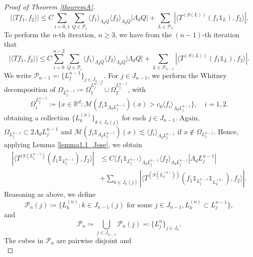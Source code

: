 \documentclass[12pt]{amsart}
\newcommand{\R}{\mathbb{R}}
\theoremstyle{plain}
\theoremstyle{definition} %
\numberwithin{equation}{section}
\begin{document}
\begin{proof}[Proof of Theorem \ref{theoremA}]
    \begin{equation}\label{eq:Level2Bound}
        |\langle Tf_1,f_2\rangle|
        \leq 
        C\sum_{i=0,1}\sum_{Q\in\mathcal{P}_i}
        \langle f_1\rangle_{\Lambda_d Q}\langle f_2\rangle_{\Lambda_d Q}|\Lambda_d Q|
        +
        \sum_{L\in \mathcal{P}_2}|\langle T^{(S(L))}(f_1\mathds{1}_{L}),f_2\rangle|.
    \end{equation}
To perform the $n$-th iteration, $n\geq 3$, we have from the $(n-1)$-th iteration that
    \begin{equation}\label{eq:LevelNMinus1Bound}
        |\langle Tf_1,f_2\rangle|
        \leq 
        C\sum_{i=0}^{n-2}\sum_{Q\in\mathcal{P}_i}
        \langle f_1\rangle_{\Lambda_d Q}\langle f_2\rangle_{\Lambda_d Q}|\Lambda_d Q|
        +
        \sum_{L\in \mathcal{P}_{n-1}}|\langle T^{(S(L))}(f_1\mathds{1}_{L}),f_2\rangle|.
    \end{equation}
    We write $\mathcal{P}_{n-1}\eqqcolon\{L_j^{n-1}\}_{j\in J_{n-1}}$. For $j\in J_{n-1}$, we perform the Whitney decomposition of $\Omega_{L_j^{n-1}}\coloneqq \Omega_1^{L_{j}^{n-1}}\cup \Omega_2^{L_j^{n-1}}$, with
    \[
    \Omega_{i}^{L_j^{n-1}}
    \coloneqq 
    \{x\in\R^d: \mathcal{M}(f_i\mathds{1}_{\Lambda_d L_j^{n-1}})(x)>c_0\langle f_i\rangle_{\Lambda_d L_{j}^{n-1}}\},
    \quad i=1,2.
    \]
obtaining a collection $\{L_{k}^{(n)}\}_{k\in J_{n}(j)}$ for each $j\in J_{n-1}$. Again, $\Omega_{L_j^{n-1}}\subset 2\Lambda_d L_j^{n-1}$ and $\mathcal{M}(f_i\mathds{1}_{\Lambda_d L_j^{n-1}})(x) \lesssim \langle f_i\rangle_{\Lambda_d L_j^{n-1}}$ if $x\not\in \Omega_{L_j^{n-1}}$. Hence, applying Lemma \ref{lemma1.1_Jose}, we obtain
    \begin{align}\label{eq:genericLevelBound}
        \nonumber|\langle T^{(S(L_{j}^{n-1})}(f_1\mathds{1}_{L_j^{n-1}}),f_2\rangle |
        &\leq 
        C\langle f_1\mathds{1}_{L_j^{n-1}}\rangle_{\Lambda_d L_j^{n-1}}\langle f_2\rangle_{\Lambda_d L_j^{n-1}}|\Lambda_d L_j^{n-1}|
        \\&+
        \sum_{k\in J_n(j)}|\langle T^{(S(L_{k}^{(n)}))}(f_1\mathds{1}_{L_j^{n-1}}\mathds{1}_{L_{k}^{(n)}}),f_2\rangle|.
    \end{align}
Reasoning as above, we define 
    \[
    \mathcal{P}_n(j)\coloneqq \{L_{k}^{(n)}: k\in J_{n-1}(j) \text{ for some }j\in J_{n-1}, L_{k}^{(n)}\subset L_j^{n-1}\},
    \]
    and
    \[
    \mathcal{P}_n
    \coloneqq 
    \bigcup_{j\in J_{n-1}} \mathcal{P}_{n}(j)
    \eqqcolon 
    \{L_j^{n}\}_{j\in J_{n}}.
    \]
The cubes in $\mathcal{P}_n$ are pairwise disjoint and
    \begin{equation}\label{eq:LevelNBound}

\end{equation}
\end{proof}
\end{document}
